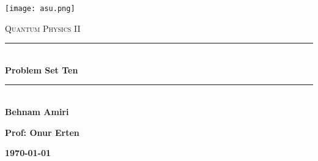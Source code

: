 \documentclass[fleqn]{article}
\begin{document}
  \begin{titlepage}

    \newcommand{\HRule}{\rule{\linewidth}{0.5mm}}

    \center

    \begin{center}
      \texttt{[image: asu.png]}
    \end{center}

    \vline

    \textsc{\LARGE Quantum Physics II}\\[1.5cm]

    \HRule \\[0.5cm]
    { \huge \bfseries Problem Set Ten}\\[0.4cm] 
    \HRule \\[1.0cm]

    \textbf{Behnam Amiri}

    \bigbreak

    \textbf{Prof: Onur Erten}

    \bigbreak

    \textbf{{\large \today}\\[2cm]}

    \vfill

  \end{titlepage}
\end{document}
